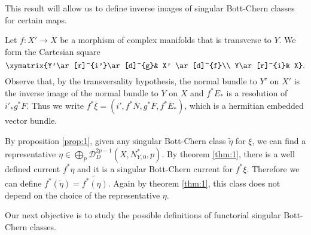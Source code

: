 \documentclass[10pt,twoside]{article}
\numberwithin{equation}{section}
\theoremstyle{plain}
\theoremstyle{definition}
\begin{document}
This result will allow us to define inverse images of singular
Bott-Chern classes for certain maps.

Let $f\colon X'\longrightarrow X$ be a morphism of complex
manifolds that is transverse to $Y$. We form the
Cartesian square
\begin{displaymath}
  \xymatrix{Y'\ar[r]^{i'}\ar[d]^{g}& X' \ar[d]^{f}\\
    Y\ar[r]^{i}& X}.
\end{displaymath}
Observe that, by the transversality hypothesis, the normal bundle to
$Y'$ on $X'$ is the inverse image of the normal bundle to $Y$ on $X$
and $f^{\ast} E_{\ast}$ is a resolution of
$i'_{\ast}g^{\ast}F$.
Thus we write $f^{\ast}\overline \xi=(i',f^{\ast}\overline
N,g^{\ast} \overline F, f^{\ast} \overline E_{\ast} )$, which is a
hermitian embedded vector bundle.

By proposition \ref{prop:1}, given any singular Bott-Chern class
$\widetilde 
\eta$ for 
$\xi$, we can find a representative $\eta \in  \bigoplus_{p}
  \mathcal{D}^{2p-1}_{D}(X,N^{\ast}_{Y,0},p)$. By theorem \ref{thm:1},
  there is a well defined current $f^{\ast}\eta$ and it
is a singular Bott-Chern current for $f^{\ast}\xi$. Therefore we can
define $f^{\ast}(\widetilde \eta)=\widetilde{f^{\ast}(\eta)}$.  Again
by theorem 
\ref{thm:1}, this class does not depend on the choice of the
representative $\eta$. 

Our next objective is to study
the possible definitions of functorial singular Bott-Chern
classes.    
\end{document}
